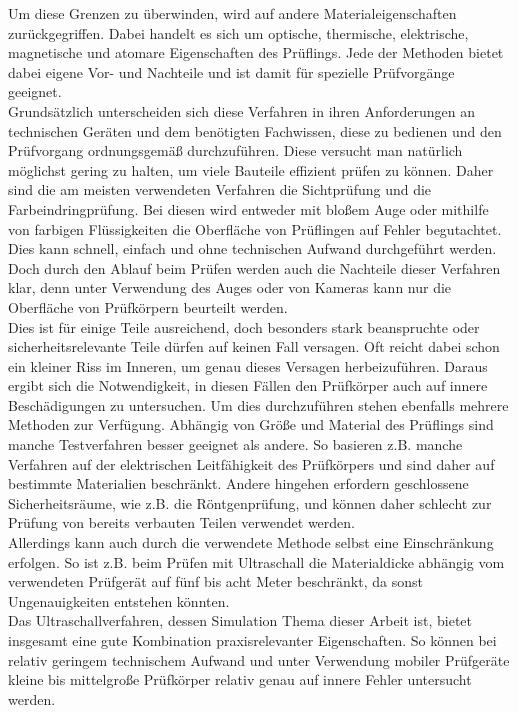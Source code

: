 \documentclass[reducespace,stylepage,semiarbeit]{spezidoc}
\begin{document}
Um diese Grenzen zu überwinden, wird auf andere Materialeigenschaften zurückgegriffen.
Dabei handelt es sich um optische, thermische, elektrische, magnetische und atomare Eigenschaften des Prüflings. 
Jede der Methoden bietet dabei eigene Vor- und Nachteile und ist damit für spezielle Prüfvorgänge geeignet. \\ 
Grundsätzlich unterscheiden sich diese Verfahren in ihren Anforderungen an technischen Geräten und dem benötigten Fachwissen, diese zu bedienen und den Prüfvorgang ordnungsgemäß durchzuführen. 
Diese versucht man natürlich möglichst gering zu halten, um viele Bauteile effizient prüfen zu können.
Daher sind die am meisten verwendeten Verfahren die Sichtprüfung und die Farbeindringprüfung. 
Bei diesen wird entweder mit bloßem Auge oder mithilfe von farbigen Flüssigkeiten die Oberfläche von Prüflingen auf Fehler begutachtet. 
Dies kann schnell, einfach und ohne technischen Aufwand durchgeführt werden.
Doch durch den Ablauf beim Prüfen werden auch die Nachteile dieser Verfahren klar, denn unter Verwendung des Auges oder von Kameras kann nur die Oberfläche von Prüfkörpern beurteilt werden. \\
Dies ist für einige Teile ausreichend, doch besonders stark beanspruchte oder sicherheitsrelevante Teile dürfen auf keinen Fall versagen. 
Oft reicht dabei schon ein kleiner Riss im Inneren, um genau dieses Versagen herbeizuführen. 
Daraus ergibt sich die Notwendigkeit, in diesen Fällen den Prüfkörper auch auf innere Beschädigungen zu untersuchen.
Um dies durchzuführen stehen ebenfalls mehrere Methoden zur Verfügung.
Abhängig von Größe und Material des Prüflings sind manche Testverfahren besser geeignet als andere. 
So basieren z.B. manche Verfahren auf der elektrischen Leitfähigkeit des Prüfkörpers und sind daher auf bestimmte Materialien beschränkt.
Andere hingehen erfordern geschlossene Sicherheitsräume, wie z.B. die Röntgenprüfung, und können daher schlecht zur Prüfung von bereits verbauten Teilen verwendet werden.\\
Allerdings kann auch durch die verwendete Methode selbst eine Einschränkung erfolgen. So ist z.B. beim Prüfen mit Ultraschall die Materialdicke abhängig vom verwendeten Prüfgerät auf fünf bis acht Meter beschränkt, da sonst Ungenauigkeiten entstehen könnten.\\
Das Ultraschallverfahren, dessen Simulation Thema dieser Arbeit ist, bietet insgesamt eine gute Kombination praxisrelevanter
 Eigenschaften. So können bei relativ geringem technischem Aufwand und unter Verwendung mobiler Prüfgeräte kleine bis mittelgroße Prüfkörper relativ genau auf innere Fehler untersucht werden.
\end{document}
